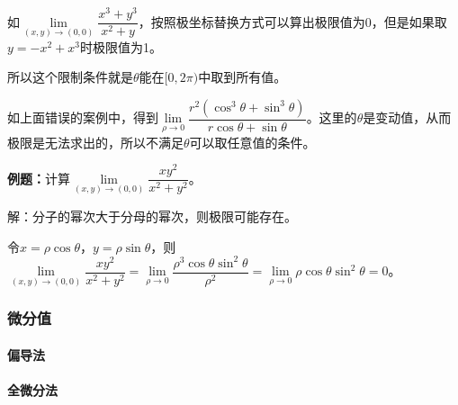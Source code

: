 \documentclass[UTF8, 12pt]{ctexart}
\begin{document}
如$\lim\limits_{(x,y)\to(0,0)}\dfrac{x^3+y^3}{x^2+y}$，按照极坐标替换方式可以算出极限值为0，但是如果取$y=-x^2+x^3$时极限值为1。

所以这个限制条件就是$\theta$能在$[0,2\pi)$中取到所有值。

如上面错误的案例中，得到$\lim\limits_{\rho\to0}\dfrac{r^2(\cos^3\theta+\sin^3\theta)}{r\cos\theta+\sin\theta}$。这里的$\theta$是变动值，从而极限是无法求出的，所以不满足$\theta$可以取任意值的条件。





\textbf{例题：}计算$\lim\limits_{(x,y)\to(0,0)}\dfrac{xy^2}{x^2+y^2}$。

解：分子的幂次大于分母的幂次，则极限可能存在。

令$x=\rho\cos\theta$，$y=\rho\sin\theta$，则$\lim\limits_{(x,y)\to(0,0)}\dfrac{xy^2}{x^2+y^2}=\lim\limits_{\rho\to0}\dfrac{\rho^3\cos\theta\sin^2\theta}{\rho^2}=\lim\limits_{\rho\to0}\rho\cos\theta\sin^2\theta=0$。




\subsubsection{微分值}

\paragraph{偏导法} \leavevmode \medskip

\paragraph{全微分法} \leavevmode \medskip
\end{document}
